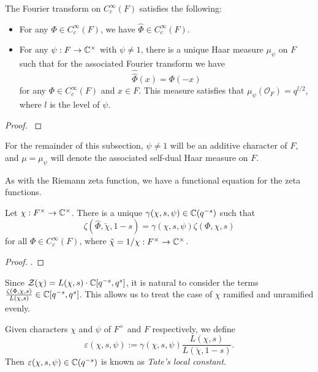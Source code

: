 \begin{prop}
    The Fourier transform on $C_c^\infty(F)$ satisfies the following:
    \begin{itemize}
        \item For any $\Phi \in C_c^\infty(F)$, we have $\hat{\Phi} \in C_c^\infty(F)$.
        \item For any $\psi: F \to \mathbb{C}^\times$ with $\psi \neq 1$, there is a unique Haar measure $\mu_\psi$ on $F$ such that for the associated Fourier transform we have $$\hat{\hat{\Phi}}(x) = \Phi(-x)$$ for any $\Phi \in C_c^\infty(F)$ and $x \in F$. This measure satisfies that $\mu_\psi(\mathcal{O}_F)=q^{l/2}$, where $l$ is the level of $\psi$.
    \end{itemize}
    
\end{prop}
\begin{proof}
    \cite[Proposition 23.1]{BH1}
\end{proof}

\begin{notn}
    For the remainder of this subsection, $\psi \neq 1$ will be an additive character of $F$, and $\mu= \mu_\psi$ will denote the associated self-dual Haar measure on $F$.
\end{notn}

As with the Riemann zeta function, we have a functional equation for the zeta functions.

\begin{thm}\label{thm:gl1gamma}
    Let $\chi: F^\times \to \mathbb{C}^\times$. There is a unique $\gamma(\chi,s,\psi) \in \mathbb{C}(q^{-s})$ such that 
    $$\zeta(\hat{\Phi}, \check{\chi},1-s) = \gamma(\chi,s,\psi) \zeta(\Phi,\chi,s)$$ for all $\Phi \in C_c^\infty(F)$, where $\check{\chi}=1/\chi : F^\times \to \mathbb{C}^\times$.
\end{thm}
\begin{proof}
    \cite[Theorem 23.3]{BH1}.
\end{proof}

Since $\mathcal Z(\chi) = L(\chi,s)\cdot \mathbb{C}[q^{-s},q^s]$, it is natural to consider the terms $\frac{\zeta(\Phi,\chi,s)}{L(\chi,s)} \in \mathbb{C}[q^{-s},q^s]$. This allows us to treat the case of $\chi$ ramified and unramified evenly. 

\begin{defn}\label{defn:localconstant}
    Given characters $\chi$ and $\psi$ of $F^\times$ and $F$ respectively,  we define %
    $$\varepsilon(\chi,s,\psi) := \gamma(\chi,s,\psi)\frac{L(\chi,s)}{L(\check{\chi},1-s)}.$$
    Then $\varepsilon(\chi,s,\psi)\in\mathbb{C}(q^{-s})$ is known as \textit{Tate's local constant}.
\end{defn}


